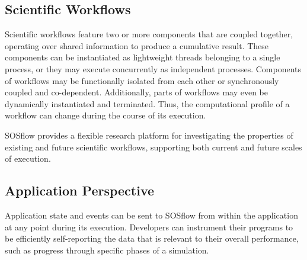 \subsection{Scientific Workflows} %
%
Scientific workflows feature two or more components that are coupled
together, operating over shared information to produce a cumulative
result.
%
These components can be instantiated as lightweight threads belonging
to a single process, or they may execute concurrently as independent
processes.
%
Components of workflows may be functionally isolated from each
other or synchronously coupled and co-dependent.
%
Additionally, parts of workflows may even be dynamically instantiated and
terminated.
%
Thus, the computational profile of a workflow can change during the course
of its execution.
%
%
\par
%
%
%
%
%
%
\par
%
%
SOSflow provides a flexible research platform for investigating the
properties of existing and future scientific workflows, supporting
both current and future scales of execution.
%
%
\subsection{Application Perspective} %
%
Application state and events can be sent to SOSflow from within the application
at any point during its execution.
%
Developers can instrument their programs to be efficiently self-reporting
the data that is relevant to their overall performance, such as progress
through specific phases of a simulation.
%
%

